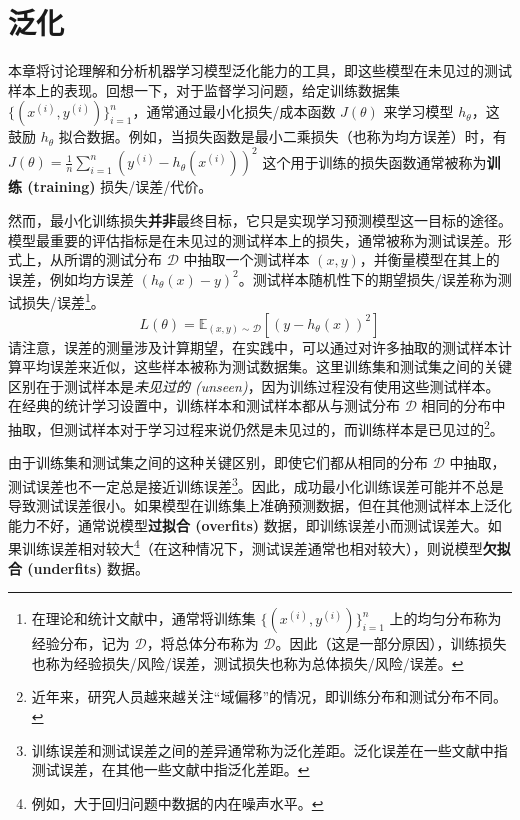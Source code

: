 \chapter{泛化}

本章将讨论理解和分析机器学习模型泛化能力的工具，即这些模型在未见过的测试样本上的表现。回想一下，对于监督学习问题，给定训练数据集 $\{(x^{(i)}, y^{(i)})\}_{i=1}^n$，通常通过最小化损失/成本函数 $J(\theta)$ 来学习模型 $h_\theta$，这鼓励 $h_\theta$ 拟合数据。例如，当损失函数是最小二乘损失（也称为均方误差）时，有 \(J(\theta) = \frac{1}{n} \sum_{i=1}^n \left(y^{(i)} - h_\theta(x^{(i)})\right)^2\) 这个用于训练的损失函数通常被称为\textbf{训练 (training)} 损失/误差/代价。

然而，最小化训练损失\textbf{并非}最终目标，它只是实现学习预测模型这一目标的途径。模型最重要的评估指标是在未见过的测试样本上的损失，通常被称为测试误差。形式上，从所谓的测试分布 $\mathcal{D}$ 中抽取一个测试样本 $(x, y)$，并衡量模型在其上的误差，例如均方误差 $(h_\theta(x) - y)^2$。测试样本随机性下的期望损失/误差称为测试损失/误差\footnote{在理论和统计文献中，通常将训练集 $\{(x^{(i)}, y^{(i)})\}_{i=1}^n$ 上的均匀分布称为经验分布，记为 $\mathcal{D}$，将总体分布称为 $\mathcal{D}$。因此（这是一部分原因），训练损失也称为经验损失/风险/误差，测试损失也称为总体损失/风险/误差。}。
\begin{equation}
    L(\theta) = \mathbb{E}_{(x,y) \sim \mathcal{D}}[(y - h_\theta(x))^2] \label{eq:8.1}
\end{equation}
请注意，误差的测量涉及计算期望，在实践中，可以通过对许多抽取的测试样本计算平均误差来近似，这些样本被称为测试数据集。这里训练集和测试集之间的关键区别在于测试样本是\textit{未见过的 (unseen)}，因为训练过程没有使用这些测试样本。在经典的统计学习设置中，训练样本和测试样本都从与测试分布 $\mathcal{D}$ 相同的分布中抽取，但测试样本对于学习过程来说仍然是未见过的，而训练样本是已见过的\footnote{近年来，研究人员越来越关注“域偏移”的情况，即训练分布和测试分布不同。}。

由于训练集和测试集之间的这种关键区别，即使它们都从相同的分布 $\mathcal{D}$ 中抽取，测试误差也不一定总是接近训练误差\footnote{训练误差和测试误差之间的差异通常称为泛化差距。泛化误差在一些文献中指测试误差，在其他一些文献中指泛化差距。}。因此，成功最小化训练误差可能并不总是导致测试误差很小。如果模型在训练集上准确预测数据，但在其他测试样本上泛化能力不好，通常说模型\textbf{过拟合 (overfits)} 数据，即训练误差小而测试误差大。如果训练误差相对较大\footnote{例如，大于回归问题中数据的内在噪声水平。}（在这种情况下，测试误差通常也相对较大），则说模型\textbf{欠拟合 (underfits)} 数据。

